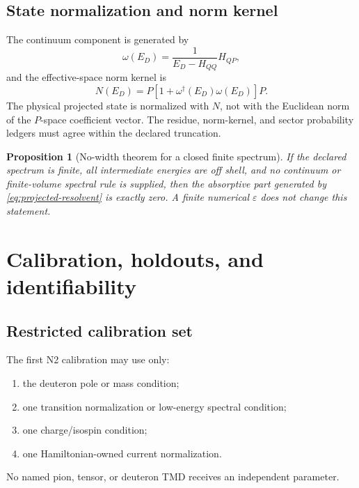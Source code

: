 \documentclass[11pt]{article}
\newtheorem{proposition}[definition]{Proposition}
\newcommand{\eps}{\varepsilon}
\begin{document}
\subsection{State normalization and norm kernel}

The continuum component is generated by
\begin{equation}
 \omega(E_D)
 =
 \frac{1}{E_D-H_{QQ}}H_{QP},
 \label{eq:wave-operator}
\end{equation}
and the effective-space norm kernel is
\begin{equation}
 N(E_D)=P\left[1+\omega^{\dagger}(E_D)\omega(E_D)\right]P.
 \label{eq:norm-kernel}
\end{equation}
The physical projected state is normalized with \(N\), not with the Euclidean
norm of the \(P\)-space coefficient vector.  The residue, norm-kernel, and
sector probability ledgers must agree within the declared truncation.

\begin{proposition}[No-width theorem for a closed finite spectrum]
If the declared spectrum is finite, all intermediate energies are off shell,
and no continuum or finite-volume spectral rule is supplied, then the
absorptive part generated by \cref{eq:projected-resolvent} is exactly zero.
A finite numerical \(\eps\) does not change this statement.
\end{proposition}

\section{Calibration, holdouts, and identifiability}
\label{sec:calibration}

\subsection{Restricted calibration set}

The first N2 calibration may use only:
\begin{enumerate}
\item the deuteron pole or mass condition;
\item one transition normalization or low-energy spectral condition;
\item one charge/isospin condition;
\item one Hamiltonian-owned current normalization.
\end{enumerate}
No named pion, tensor, or deuteron TMD receives an independent parameter.
\end{document}
